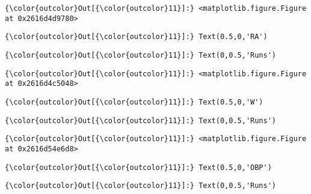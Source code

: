 \documentclass[11pt]{article}
\begin{document}
\begin{Verbatim}[commandchars=\\\{\}]
{\color{outcolor}Out[{\color{outcolor}11}]:} <matplotlib.figure.Figure at 0x2616d4d9780>
\end{Verbatim}
            
\begin{Verbatim}[commandchars=\\\{\}]
{\color{outcolor}Out[{\color{outcolor}11}]:} Text(0.5,0,'RA')
\end{Verbatim}
            
\begin{Verbatim}[commandchars=\\\{\}]
{\color{outcolor}Out[{\color{outcolor}11}]:} Text(0,0.5,'Runs')
\end{Verbatim}
            
\begin{Verbatim}[commandchars=\\\{\}]
{\color{outcolor}Out[{\color{outcolor}11}]:} <matplotlib.figure.Figure at 0x2616d4c5048>
\end{Verbatim}
            
\begin{Verbatim}[commandchars=\\\{\}]
{\color{outcolor}Out[{\color{outcolor}11}]:} Text(0.5,0,'W')
\end{Verbatim}
            
\begin{Verbatim}[commandchars=\\\{\}]
{\color{outcolor}Out[{\color{outcolor}11}]:} Text(0,0.5,'Runs')
\end{Verbatim}
            
\begin{Verbatim}[commandchars=\\\{\}]
{\color{outcolor}Out[{\color{outcolor}11}]:} <matplotlib.figure.Figure at 0x2616d54e6d8>
\end{Verbatim}
            
\begin{Verbatim}[commandchars=\\\{\}]
{\color{outcolor}Out[{\color{outcolor}11}]:} Text(0.5,0,'OBP')
\end{Verbatim}
            
\begin{Verbatim}[commandchars=\\\{\}]
{\color{outcolor}Out[{\color{outcolor}11}]:} Text(0,0.5,'Runs')
\end{Verbatim}
            
\end{document}
